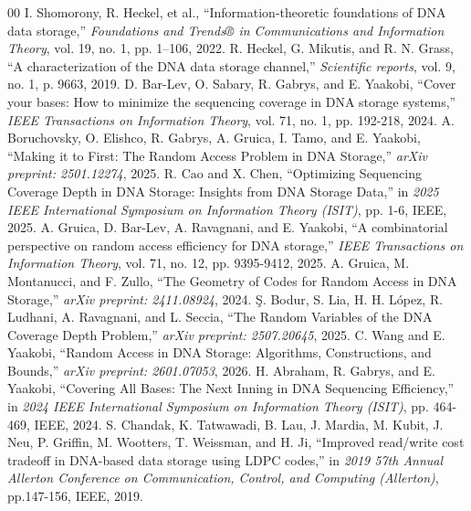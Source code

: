 \documentclass[11pt,a4paper,reqno,twoside]{article}
\theoremstyle{definition}
\begin{document}
\begin{thebibliography}{00}
 I. Shomorony, R. Heckel, et al., ``Information-theoretic foundations of DNA data storage,'' \emph{Foundations and Trends® in Communications and Information Theory}, vol. 19, no. 1, pp. 1–106, 2022.
 R. Heckel, G. Mikutis, and R. N. Grass, ``A characterization of the DNA data storage channel,'' \emph{Scientific reports}, vol. 9, no. 1, p. 9663, 2019.
 D. Bar-Lev, O. Sabary, R. Gabrys, and E. Yaakobi, ``Cover your bases: How to minimize the sequencing coverage in DNA storage systems,'' \emph{IEEE Transactions on Information Theory}, vol. 71, no. 1, pp. 192-218, 2024.
 A. Boruchovsky, O. Elishco, R. Gabrys, A. Gruica, I. Tamo, and E. Yaakobi, ``Making it to First: The Random Access Problem in DNA Storage,'' \emph{arXiv preprint: 2501.12274}, 2025.
 R. Cao and X. Chen, ``Optimizing Sequencing Coverage Depth in DNA Storage: Insights from DNA Storage Data,'' in \emph{2025 IEEE International Symposium on Information Theory (ISIT)}, pp. 1-6, IEEE, 2025.
 A. Gruica, D. Bar-Lev, A. Ravagnani, and E. Yaakobi, ``A combinatorial perspective on random access efficiency for DNA storage,'' \emph{IEEE Transactions on Information Theory}, vol. 71, no. 12, pp. 9395-9412, 2025.
 A. Gruica, M. Montanucci, and F. Zullo, ``The Geometry of Codes for Random Access in DNA Storage,'' \emph{arXiv preprint: 2411.08924}, 2024.
 \c{S}. Bodur, S. Lia, H. H. L\'{o}pez, R. Ludhani, A. Ravagnani, and L. Seccia, ``The Random Variables of the DNA Coverage Depth Problem,'' \emph{arXiv preprint: 2507.20645}, 2025.
 C. Wang and E. Yaakobi, ``Random Access in DNA Storage: Algorithms, Constructions, and Bounds,'' \emph{arXiv preprint: 2601.07053}, 2026.
 H. Abraham, R. Gabrys, and E. Yaakobi, ``Covering All Bases: The Next Inning in DNA Sequencing Efficiency,'' in \emph{2024 IEEE International Symposium on Information Theory (ISIT)}, pp. 464-469, IEEE, 2024.
 S. Chandak, K. Tatwawadi, B. Lau, J. Mardia, M. Kubit, J. Neu, P. Griffin, M. Wootters, T. Weissman, and H. Ji, ``Improved read/write cost tradeoff in DNA-based data storage using LDPC codes,'' in \emph{2019 57th Annual Allerton Conference on Communication, Control, and Computing (Allerton)}, pp.147-156, IEEE, 2019.


\end{thebibliography}
\end{document}
